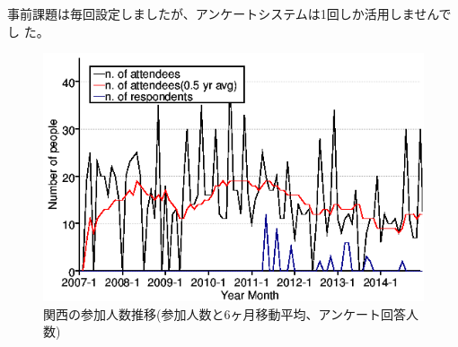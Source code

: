 \documentclass[mingoth,a4paper]{jsarticle}
\begin{document}
事前課題は毎回設定しましたが、アンケートシステムは1回しか活用しませんでし
た。

%
\begin{figure}[h]
  \begin{center}
    \includegraphics[width=.6\hsize]{image201412/memberanalysis/kansai.png}
  \end{center}
  \caption{関西の参加人数推移(参加人数と6ヶ月移動平均、アンケート回答人数)}
  \label{fig:kansaipeoplechart}
\end{figure}

\end{document}

